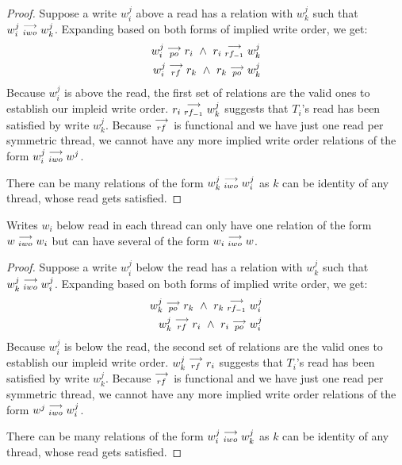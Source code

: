     \begin{proof}
        Suppose a write $w_i^j$ above a read has a relation with $w_k^j$ such that $w_i^j\stackrel{\longrightarrow}{_{iwo}}w_k^j$. Expanding based on both forms of implied write order, we get:
        \begin{align}
            w_i^j\stackrel{\longrightarrow}{_{po}}r_i \ \wedge \ r_i\stackrel{\longrightarrow}{_{rf_{-1}}}w_k^j \\ 
            w_i^j\stackrel{\longrightarrow}{_{rf}}r_k \ \wedge \ r_k\stackrel{\longrightarrow}{_{po}}w_k^j
        \end{align}
        Because $w_i^j$ is above the read, the first set of relations are the valid ones to establish our impleid write order. $r_i\stackrel{\longrightarrow}{_{rf_{-1}}}w_k^j$ suggests that $T_i$'s read has been satisfied by write $w_k^j$. Because $\stackrel{\longrightarrow}{_{rf}}$ is functional and we have just one read per symmetric thread, we cannot have any more implied write order relations of the form $w_i^j\stackrel{\longrightarrow}{_{iwo}}w^j$. 

        There can be many relations of the form $w_k^j\stackrel{\longrightarrow}{_{iwo}}w_i^j$ as $k$ can be identity of any thread, whose read gets satisfied.  
    \end{proof}

   
    \begin{property}
        Writes $w_i$ below read in each thread can only have one relation of the form $w\stackrel{\longrightarrow}{_{iwo}}w_i$ but can have several of the form $w_i\stackrel{\longrightarrow}{_{iwo}}w$. 
    \end{property}

    \begin{proof}
        Suppose a write $w_i^j$ below the read has a relation with $w_k^j$ such that $w_k^j\stackrel{\longrightarrow}{_{iwo}}w_i^j$. Expanding based on both forms of implied write order, we get:
        \begin{align}
            w_k^j\stackrel{\longrightarrow}{_{po}}r_k \ \wedge \ r_k\stackrel{\longrightarrow}{_{rf_{-1}}}w_i^j \\ 
            w_k^j\stackrel{\longrightarrow}{_{rf}}r_i \ \wedge \ r_i\stackrel{\longrightarrow}{_{po}}w_i^j
        \end{align}
        Because $w_i^j$ is below the read, the second set of relations are the valid ones to establish our impleid write order. $w_k^j\stackrel{\longrightarrow}{_{rf}}r_i$ suggests that $T_i$'s read has been satisfied by write $w_k^j$. Because $\stackrel{\longrightarrow}{_{rf}}$ is functional and we have just one read per symmetric thread, we cannot have any more implied write order relations of the form $w^j\stackrel{\longrightarrow}{_{iwo}}w_i^j$. 

        There can be many relations of the form $w_i^j\stackrel{\longrightarrow}{_{iwo}}w_k^j$ as $k$ can be identity of any thread, whose read gets satisfied.  
    \end{proof}

